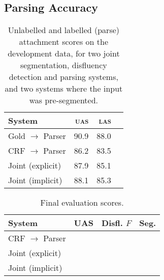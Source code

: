 \documentclass[11pt,letterpaper]{article}
\begin{document}
\subsection{Parsing Accuracy}

%
%
%
%

\begin{table}
    \centering
    \small
    \begin{tabular}{l|rrr}
        \hline
        System & \textsc{uas} & \textsc{las} \\
        \hline \hline
        Gold $\rightarrow$ Parser & 90.9 & 88.0 \\
        CRF $\rightarrow$  Parser & 86.2 & 83.5 \\
        Joint (explicit)          & 87.9 & 85.1 \\
        Joint (implicit)          & 88.1 & 85.3 \\
        \hline
    \end{tabular}
    \caption{\small Unlabelled and labelled (parse) attachment scores on the
        development data, for two joint segmentation, disfluency detection
        and parsing systems,
        and two systems where the input was pre-segmented.
        \label{tab:parse}}
\end{table}



\begin{table}
    \centering
    \small
    \begin{tabular}{l|rrr}
        \hline
        System & UAS & Disfl. $F$ & Seg. \\
        \hline \hline
        CRF $\rightarrow$ Parser &      &      &  \\
        Joint (explicit)         &      &      &  \\
        Joint (implicit)         & \\
        \hline
    \end{tabular}
    \caption{\small Final evaluation scores.}
\end{table}
\end{document}
